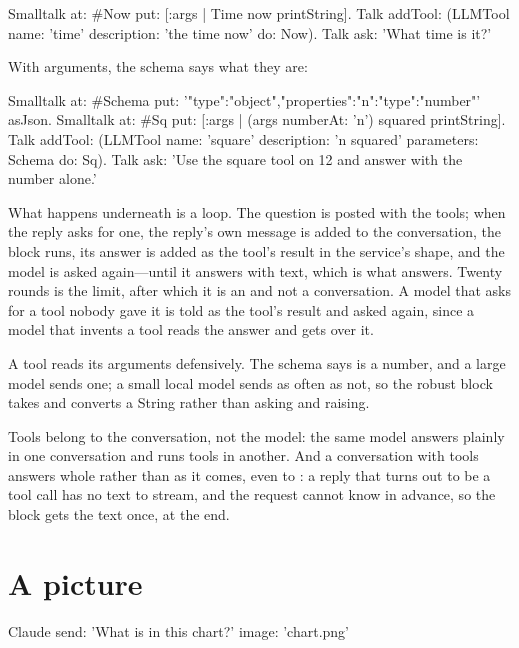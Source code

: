 \begin{st}
Smalltalk at: #Now put: [:args | Time now printString].
Talk addTool: (LLMTool name: 'time' description: 'the time now' do: Now).
Talk ask: 'What time is it?'
\end{st}

With arguments, the schema says what they are:

\begin{st}
Smalltalk at: #Schema put: '{"type":"object","properties":{"n":{"type":"number"}}}' asJson.
Smalltalk at: #Sq put: [:args | (args numberAt: 'n') squared printString].
Talk addTool: (LLMTool name: 'square' description: 'n squared' parameters: Schema do: Sq).
Talk ask: 'Use the square tool on 12 and answer with the number alone.'
\end{st}

What happens underneath is a loop. The question is posted with the tools;
when the reply asks for one, the reply's own message is added to the
conversation, the block runs, its answer is added as the tool's result in
the service's shape, and the model is asked again---until it answers with
text, which is what  answers. Twenty rounds is the limit, after
which it is an  and not a conversation. A model that asks for
a tool nobody gave it is told  as the tool's result and
asked again, since a model that invents a tool reads the answer and gets
over it.

A tool reads its arguments defensively. The schema says  is a
number, and a large model sends one; a small local model sends 
as often as not, so the robust block takes  and converts
a String rather than asking  and raising.

Tools belong to the conversation, not the model: the same model answers
plainly in one conversation and runs tools in another. And a conversation
with tools answers whole rather than as it comes, even to : a
reply that turns out to be a tool call has no text to stream, and the
request cannot know in advance, so the block gets the text once, at the
end.

\section{A picture}

\begin{st}
Claude send: 'What is in this chart?' image: 'chart.png'
\end{st}

